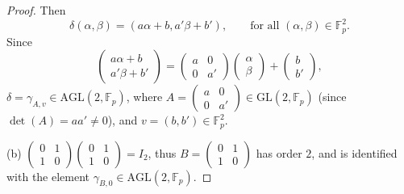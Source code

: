 \documentclass[11pt,a4paper]{article}
\newcommand{\F}{\mathbb{F}}
\begin{document}
{\begin{proof}
Then $$\delta(\alpha,\beta) = (a\alpha+b,a' \beta + b'), \qquad \text{for all } (\alpha,\beta) \in \F_p^2.$$
Since
$$
\begin{pmatrix}
a\alpha + b\\
a' \beta + b' 
\end{pmatrix}
=
\begin{pmatrix}
a & 0\\
0&a'
\end{pmatrix}
\begin{pmatrix}
\alpha\\
\beta
\end{pmatrix}
+
\begin{pmatrix}
b\\
b'
\end{pmatrix},
$$
$\delta = \gamma_{A,v} \in \mathrm{AGL}(2,\F_p)$, where 
$A = 
\begin{pmatrix}
a & 0\\
0&a'
\end{pmatrix} \in \mathrm{GL}(2,\F_p)$ (since $\det(A) = aa' \ne 0$), and 
$v = (b,b') \in \F_p^2$.

\item[(b)] 
$\begin{pmatrix}
0&1\\
1&0
\end{pmatrix}
\begin{pmatrix}
0&1\\
1&0
\end{pmatrix}
=I_2
$, thus 
$B = \begin{pmatrix}
0&1\\
1&0
\end{pmatrix}$ has order $2$, and is identified with the element $\gamma_{B,0} \in \mathrm{AGL}(2,\F_p)$.


\end{proof}}
\end{document}
